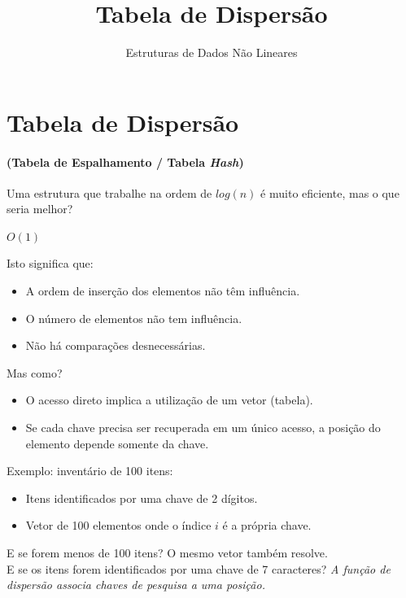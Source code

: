 \documentclass{UnBeamer}%
\title{Tabela de Dispersão}%
\subtitle{Estruturas de Dados Não Lineares}%
\begin{document}
%
	\frame[label=notas]{\titlepage}%

	\section{Tabela de Dispersão}
	\begin{frame}[label=notas]
		\framesubtitle{(Tabela de Espalhamento / Tabela \emph{Hash})}

		Uma estrutura que trabalhe na ordem de $log(n)$ é muito eficiente\pause,
		mas o que seria melhor?\pause
		\begin{center}
			\Large $O(1)$
		\end{center}
		Isto significa que: \pause
		\begin{itemize}
			\item A ordem de inserção dos elementos não têm influência.  \pause
			\item O número de elementos não tem influência.  \pause
			\item Não há comparações desnecessárias.  \pause
		\end{itemize}
		\vfill
		Mas como?
		\begin{itemize}[<+->]
			\item O acesso direto implica a utilização de um vetor (tabela).
			\item Se cada chave precisa ser recuperada em um único acesso,
			\alert{a posição do elemento depende somente da chave}.
		\end{itemize}
	\end{frame}

	\begin{frame}
		Exemplo: inventário de 100 itens:\pause
		\begin{itemize}
			\item Itens identificados por uma chave de 2 dígitos.
			\item Vetor de 100 elementos onde o índice $i$ é a própria chave.
		\end{itemize}
		\vfill\pause
		E se forem menos de 100 itens? \pause O mesmo vetor também resolve.
		\\\vfill\pause
		E se os itens forem identificados por uma chave de 7 caracteres?\pause
		\vfill
		\emph{A função de dispersão associa chaves de pesquisa a uma posição.}
	\end{frame}
\end{document}
